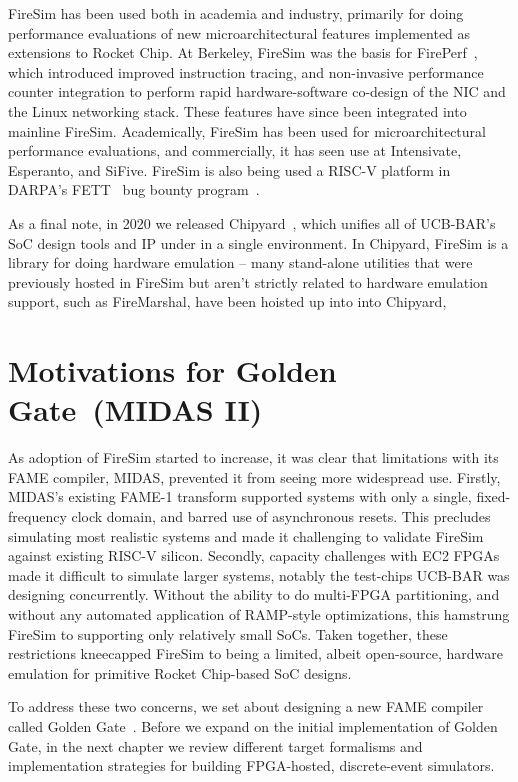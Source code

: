 FireSim has been used both in academia and industry, primarily for doing
performance evaluations of new microarchitectural features implemented as
extensions to Rocket Chip.  At Berkeley, FireSim was the basis for
FirePerf~\cite{FirePerf}, which introduced improved instruction tracing, and
non-invasive performance counter integration to perform rapid hardware-software co-design of the NIC
and the Linux networking stack. These features have since been integrated into
mainline FireSim. Academically, FireSim has been used for microarchitectural performance evaluations,
and commercially, it has seen use at Intensivate, Esperanto, and SiFive. FireSim is also being used a RISC-V platform in DARPA's
FETT~\cite{FETT} bug bounty program~\cite{FireSimFETT}.

As a final note, in 2020 we released Chipyard~\cite{Chipyard}, which unifies all of
UCB-BAR's SoC design tools and IP under in a single environment. In Chipyard,
FireSim is a library for doing hardware emulation -- many stand-alone utilities
that were previously hosted in FireSim but aren't strictly related to hardware emulation
support, such as FireMarshal, have been hoisted up into into Chipyard,

\section{Motivations for Golden Gate~(MIDAS II)}

As adoption of FireSim started to increase, it was clear that limitations with
its FAME compiler, MIDAS, prevented it from seeing more widespread use. Firstly, MIDAS's existing FAME-1
transform supported systems with only a single, fixed-frequency clock domain,
and barred use of asynchronous resets. This precludes
simulating most realistic systems and made it challenging to validate FireSim
against existing RISC-V silicon. Secondly, capacity challenges with EC2
FPGAs made it difficult to simulate larger systems, notably the test-chips
UCB-BAR was designing concurrently. Without the ability to do multi-FPGA
partitioning, and without any automated application of RAMP-style
optimizations, this hamstrung FireSim to supporting only relatively small
SoCs. Taken together, these restrictions kneecapped FireSim to being a limited, albeit
open-source, hardware emulation for primitive Rocket Chip-based SoC designs.

To address these two concerns, we set about designing a new FAME compiler
called Golden Gate~\cite{GoldenGate}. Before we expand on the initial
implementation of Golden Gate, in the next chapter we review different target formalisms and
implementation strategies for building FPGA-hosted, discrete-event simulators.

